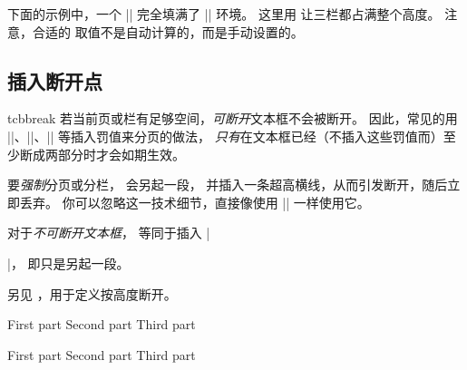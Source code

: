 下面的示例中，一个 |\tcolorbox| 完全填满了 |\multicols| 环境。
这里用  让三栏都占满整个高度。
注意，合适的  取值不是自动计算的，而是手动设置的。

\begin{dispListing}
\small
\begin{multicols}{3}
  \begin{tcolorbox}[enhanced jigsaw,breakable,size=small,
    colback=red!5!white,colframe=red!75!black,fonttitle=\bfseries,
    title=My breakable box,pad at break=2mm,drop fuzzy shadow,
    height fixed for=all, break at=11.4cm ]
  \lipsum[1-3]
  \end{tcolorbox}
\end{multicols}
\end{dispListing}
{\tcbusetemp}

\clearpage
\subsection{插入断开点}\label{subsec:breakpoints}

\begin{docCommand}[doc new=2017-07-05]{tcbbreak}{}
  若当前页或栏有足够空间，\emph{可断开}文本框不会被断开。
  因此，常见的用 |\break|、|\pagebreak|、|\columnbreak| 等插入罚值来分页的做法，
  \emph{只有}在文本框已经（不插入这些罚值而）至少断成两部分时才会如期生效。
  \par\smallskip
  要\emph{强制}分页或分栏， 会另起一段，
  并插入一条超高横线，从而引发断开，随后立即丢弃。
  你可以忽略这一技术细节，直接像使用 |\pagebreak| 一样使用它。\par\smallskip
  对于\emph{不可断开文本框}， 等同于插入 |\par|，
  即只是另起一段。\par\smallskip
  另见 ，用于定义按高度断开。

\begin{dispListing}
\begin{multicols}{3}
  \begin{tcolorbox}[breakable,enhanced jigsaw,size=small,
    colback=red!5!white,colframe=red!75!black,fonttitle=\bfseries,
    title=Break into parts
  ]
  First part\tcbbreak
  Second part\tcbbreak
  Third part
  \end{tcolorbox}
\end{multicols}

\begin{multicols}{3}
  \begin{tcolorbox}[enhanced jigsaw,size=small,
    colback=red!5!white,colframe=red!75!black,fonttitle=\bfseries,
    title=You shall not break
  ]
  First part\tcbbreak
  Second part\tcbbreak
  Third part
  \end{tcolorbox}
\end{multicols}

\end{dispListing}
{\tcbusetemp}

\end{docCommand}



